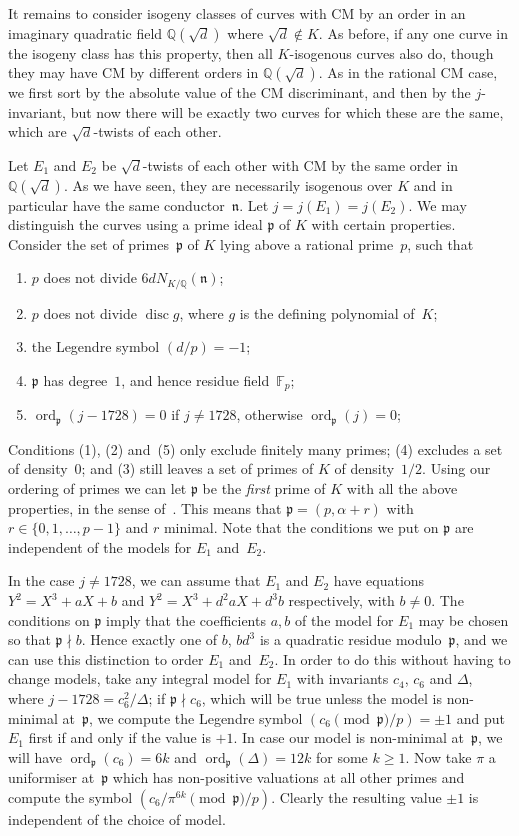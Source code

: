 \documentclass{article}
\theoremstyle{remark}
\def\Q{{\mathbb Q}}
\def\F{{\mathbb F}}
\def\n{{\mathfrak n}}
\def\p{{\mathfrak p}}
\DeclareMathOperator{\disc}{disc}
\DeclareMathOperator{\ord}{ord}
\begin{document}
It remains to consider isogeny classes of curves with CM by an order
in an imaginary quadratic field $\Q(\sqrt{d})$ where $\sqrt{d}\notin
K$.  As before, if any one curve in the isogeny class has this
property, then all $K$-isogenous curves also do, though they may have
CM by different orders in $\Q(\sqrt{d})$.  As in the rational CM case,
we first sort by the absolute value of the CM discriminant, and then
by the $j$-invariant, but now there will be exactly two curves for
which these are the same, which are $\sqrt{d}$-twists of each other.

Let $E_1$ and $E_2$ be $\sqrt{d}$-twists of each other with CM by the
same order in $\Q(\sqrt{d})$.  As we have seen, they are necessarily
isogenous over $K$ and in particular have the same conductor~$\n$.
Let $j=j(E_1)=j(E_2)$.  We may distinguish the curves using a prime
ideal $\p$ of $K$ with certain properties.  Consider the set of
primes~$\p$ of $K$ lying above a rational prime~$p$, such that
\begin{enumerate}
\item $p$ does not divide $6dN_{K/\Q}(\n)$;
\item $p$ does not divide $\disc g$, where $g$ is the defining polynomial
  of~$K$;
\item the Legendre symbol $(d/p)=-1$;
\item $\p$ has degree~$1$, and hence residue field~$\F_p$;
\item $\ord_{\p}(j-1728)=0$ if $j\not=1728$, otherwise $\ord_{\p}(j)=0$;
\end{enumerate}
Conditions (1), (2) and~(5) only exclude finitely many primes; (4)
excludes a set of density~$0$; and (3) still leaves a set of primes of
$K$ of density~$1/2$.  Using our ordering of primes we can let $\p$ be
the \textit{first} prime of $K$ with all the above properties, in the
sense of~\cite{CremonaPageSutherland}.  This means that
$\p=(p,\alpha+r)$ with $r\in\{0,1,\dots,p-1\}$ and $r$ minimal. Note
that the conditions we put on $\p$ are independent of the models for
$E_1$ and~$E_2$.

In the case $j\not=1728$, we can assume that $E_1$ and $E_2$ have
equations $Y^2=X^3+aX+b$ and $Y^2=X^3+d^2aX+d^3b$ respectively, with
$b\not=0$.  The conditions on $\p$ imply that the coefficients $a,b$
of the model for $E_1$ may be chosen so that $\p\nmid b$.  Hence
exactly one of $b$, $bd^3$ is a quadratic residue modulo~$\p$, and we
can use this distinction to order $E_1$ and~$E_2$.  In order to do
this without having to change models, take any integral model for
$E_1$ with invariants $c_4$, $c_6$ and $\Delta$, where
$j-1728=c_6^2/\Delta$; if $\p\nmid c_6$, which will be true unless the
model is non-minimal at~$\p$, we compute the Legendre symbol
$(c_6\pmod{\p}/p)=\pm1$ and put $E_1$ first if and only if the value
is $+1$.  In case our model is non-minimal at~$\p$, we will have
$\ord_{\p}(c_6)=6k$ and $\ord_{\p}(\Delta)=12k$ for some $k\ge1$.  Now
take $\pi$ a uniformiser at~$\p$ which has non-positive valuations at
all other primes and compute the symbol $(c_6/\pi^{6k}\pmod{\p}/p)$.
Clearly the resulting value $\pm1$ is independent of the choice of
model.
\end{document}
